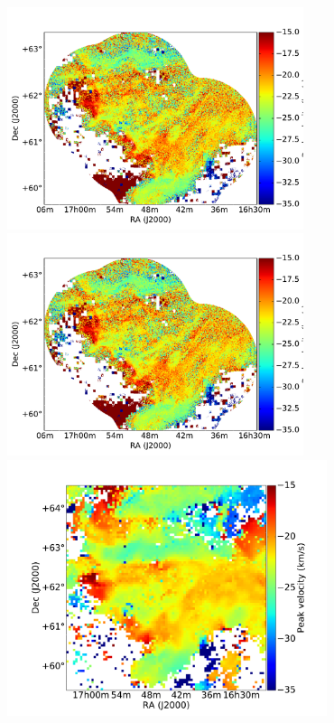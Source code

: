 \documentclass[traditabstract]{aa}
\begin{document}
\begin{figure}[h]
  \centering
  \includegraphics[page=1,height=6.5cm,trim=80 35 40 90,clip=true]{Figures/DHIGLS_velo.pdf}
  \hspace{3mm}                                
  \includegraphics[page=2,height=6.5cm,trim=80 35 60 90,clip=true]{Figures/DHIGLS_velo.pdf} \\
  \vspace{3mm}                                
  \includegraphics[page=4,height=7.5cm,trim=140 20 105 70,clip=true]{Figures/GHIGLS_velo.pdf}
  \hspace{3mm}                                

\end{figure}
\end{document}
